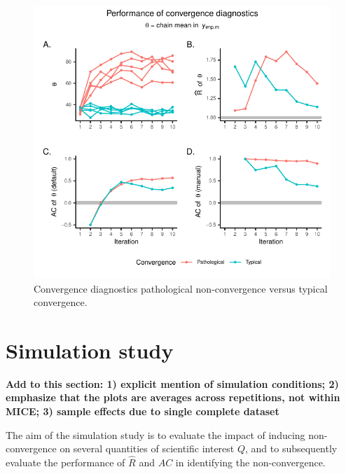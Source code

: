 \documentclass[Royal,times,sageh]{sagej}
\begin{document}
\begin{figure}

{\centering \includegraphics{manuscript_files/figure-latex/diagnostics-1} 

}

\caption{Convergence diagnostics pathological non-convergence versus typical convergence.}\label{fig:diagnostics}
\end{figure}

\hypertarget{simulation-study}{%
\section{Simulation study}\label{simulation-study}}

\textbf{Add to this section: 1) explicit mention of simulation
conditions; 2) emphasize that the plots are averages across repetitions,
not within MICE; 3) sample effects due to single complete dataset}

The aim of the simulation study is to evaluate the impact of inducing
non-convergence on several quantities of scientific interest \(Q\), and
to subsequently evaluate the performance of \(\widehat{R}\) and \(AC\)
in identifying the non-convergence.
\end{document}
